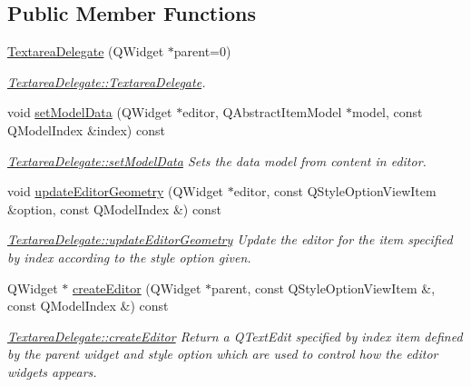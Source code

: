 \subsection*{Public Member Functions}
\begin{DoxyCompactItemize}
\item 
\hyperlink{classGui_1_1Widgets_1_1Delegates_1_1TextareaDelegate_a2dfb77334f4a12a031bed33ac5df9f5c}{Textarea\-Delegate} (Q\-Widget $\ast$parent=0)
\begin{DoxyCompactList}\small\item\em \hyperlink{classGui_1_1Widgets_1_1Delegates_1_1TextareaDelegate_a2dfb77334f4a12a031bed33ac5df9f5c}{Textarea\-Delegate\-::\-Textarea\-Delegate}. \end{DoxyCompactList}\item 
void \hyperlink{classGui_1_1Widgets_1_1Delegates_1_1TextareaDelegate_a67f7736e4cc6a6f9e2841584b4f48b25}{set\-Model\-Data} (Q\-Widget $\ast$editor, Q\-Abstract\-Item\-Model $\ast$model, const Q\-Model\-Index \&index) const 
\begin{DoxyCompactList}\small\item\em \hyperlink{classGui_1_1Widgets_1_1Delegates_1_1TextareaDelegate_a67f7736e4cc6a6f9e2841584b4f48b25}{Textarea\-Delegate\-::set\-Model\-Data} Sets the data model from content in editor. \end{DoxyCompactList}\item 
void \hyperlink{classGui_1_1Widgets_1_1Delegates_1_1TextareaDelegate_aca8f707d0638a3c0f1b6c200729b62c4}{update\-Editor\-Geometry} (Q\-Widget $\ast$editor, const Q\-Style\-Option\-View\-Item \&option, const Q\-Model\-Index \&) const 
\begin{DoxyCompactList}\small\item\em \hyperlink{classGui_1_1Widgets_1_1Delegates_1_1TextareaDelegate_aca8f707d0638a3c0f1b6c200729b62c4}{Textarea\-Delegate\-::update\-Editor\-Geometry} Update the {\itshape editor} for the item specified by {\itshape index} according to the style {\itshape option} given. \end{DoxyCompactList}\item 
Q\-Widget $\ast$ \hyperlink{classGui_1_1Widgets_1_1Delegates_1_1TextareaDelegate_ac206e0bf0a439e5fa781282aea864cd7}{create\-Editor} (Q\-Widget $\ast$parent, const Q\-Style\-Option\-View\-Item \&, const Q\-Model\-Index \&) const 
\begin{DoxyCompactList}\small\item\em \hyperlink{classGui_1_1Widgets_1_1Delegates_1_1TextareaDelegate_ac206e0bf0a439e5fa781282aea864cd7}{Textarea\-Delegate\-::create\-Editor} Return a Q\-Text\-Edit specified by {\itshape index} item defined by the {\itshape parent} widget and style {\itshape option} which are used to control how the editor widgets appears. \end{DoxyCompactList}\item 

\end{DoxyCompactItemize}
